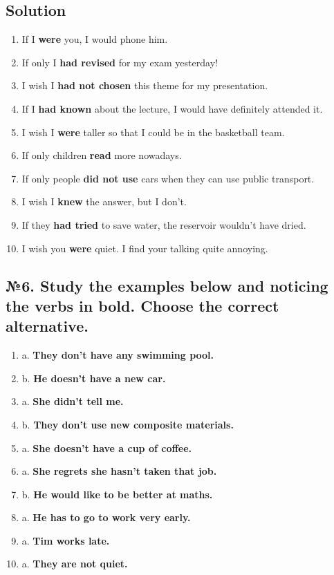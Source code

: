 \subsection*{Solution}
\begin{enumerate}
      \item If I \textbf{were} you, I would phone him.
      \item If only I \textbf{had revised} for my exam yesterday!
      \item I wish I \textbf{had not chosen} this theme for my presentation.
      \item If I \textbf{had known} about the lecture, I would have definitely attended it.
      \item I wish I \textbf{were} taller so that I could be in the basketball team.
      \item If only children \textbf{read} more nowadays.
      \item If only people \textbf{did not use} cars when they can use public transport.
      \item I wish I \textbf{knew} the answer, but I don’t.
      \item If they \textbf{had tried} to save water, the reservoir wouldn’t have dried.
      \item I wish you \textbf{were} quiet. I find your talking quite annoying.
\end{enumerate}

\subsection*{№6. Study the examples below and noticing the verbs in bold. Choose the correct alternative.}

\begin{enumerate}
      \item a. \textbf{They don’t have any swimming pool.}
      \item b. \textbf{He doesn’t have a new car.}
      \item a. \textbf{She didn’t tell me.}
      \item b. \textbf{They don’t use new composite materials.}
      \item a. \textbf{She doesn’t have a cup of coffee.}
      \item a. \textbf{She regrets she hasn’t taken that job.}
      \item b. \textbf{He would like to be better at maths.}
      \item a. \textbf{He has to go to work very early.}
      \item a. \textbf{Tim works late.}
      \item a. \textbf{They are not quiet.}
\end{enumerate}

